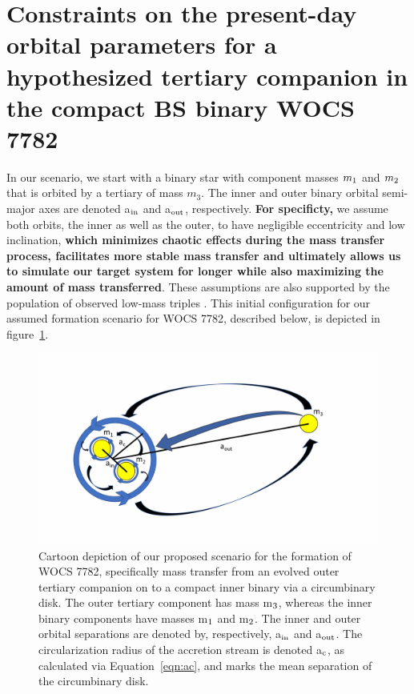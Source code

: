 \documentclass[twocolumn]{aastex62}
\begin{document}
\section{Constraints on the present-day orbital parameters for a hypothesized
         tertiary companion in the compact BS binary WOCS 7782} \label{sect:dyn}

In our scenario, we start with a binary star with component masses
$m_{\rm 1}$ and $m_{\rm 2}$ that is orbited by a tertiary of mass
$m_3$. The inner and outer binary orbital semi-major axes are denoted
a$_{\rm in}$ and a$_{\rm out}$, respectively.  \textbf{For specificty,} we 
assume both orbits, the inner as well as the outer, to have negligible
eccentricity and low inclination, \textbf{which minimizes chaotic effects during the mass transfer process, facilitates more stable mass transfer and ultimately allows us to simulate our target system for longer while also maximizing the amount of mass transferred}.  These assumptions are also
supported by the population of observed low-mass triples
\citep{2010yCat..73890925T,2018ApJ...854...44M}.  This initial configuration for our
assumed formation scenario for WOCS 7782, described below, is
depicted in figure~\ref{fig:fig1}.

\begin{figure}[ht!]
\includegraphics[width=\columnwidth]{fig_doodle.pdf}
\caption{Cartoon depiction of our proposed scenario for the formation
  of WOCS 7782, specifically mass transfer from an evolved outer
  tertiary companion on to a compact inner binary via a circumbinary
  disk.  The outer tertiary component has mass m$_{\rm 3}$, whereas
  the inner binary components have masses m$_{\rm 1}$ and m$_{\rm 2}$.
  The inner and outer orbital separations are denoted by,
  respectively, a$_{\rm in}$ and a$_{\rm out}$.  The circularization
  radius of the accretion stream is denoted a$_{\rm c}$, as calculated
  via Equation~\ref{eqn:ac}, and marks the mean separation of the
  circumbinary disk.
\label{fig:fig1}}
\end{figure}
\end{document}
